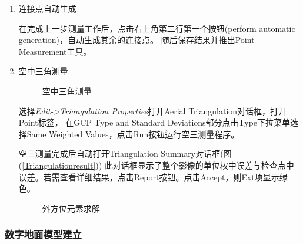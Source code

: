 \begin{enumerate}
\begin{enumerate}
        \end{enumerate}

        \item 连接点自动生成
        
        \hspace{20pt}在完成上一步测量工作后，点击右上角第二行第一个按钮(perform automatic generation)，自动生成其余的连接点。
        随后保存结果并推出Point Measurement工具。

        \item 空中三角测量
        
        \begin{figure}[H]
            \centering
            \caption{空中三角测量}
        \end{figure}

        \hspace{20pt}选择\textit{Edit->Triangulation Properties}打开Aerial Triangulation对话框，打开Point标签，
        在GCP Type and Standard Deviations部分点击Type下拉菜单选择Same Weighted Values，点击Run按钮运行空三测量程序。
    
        \hspace{20pt}空三测量完成后自动打开Triangulation Summary对话框(图(\ref{Triangulationresult}))
        此对话框显示了整个影像的单位权中误差与检查点中误差。若需查看详细结果，点击Report按钮。点击Accept，则Ext项显示绿色。

        \begin{figure}[H]
            \centering
            \caption{外方位元素求解}
        \end{figure}

    \end{enumerate}
    

    \subsubsection{数字地面模型建立}

